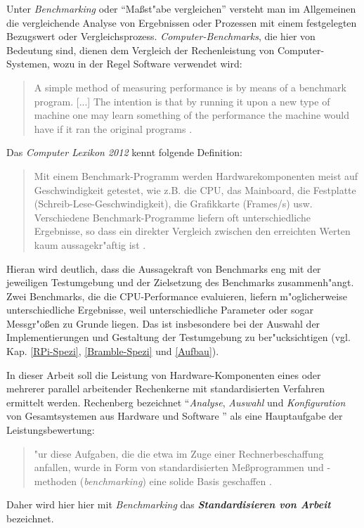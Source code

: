 Unter \textit{Benchmarking} oder "`Ma\ss st"abe vergleichen"' versteht man im Allgemeinen die vergleichende Analyse von Ergebnissen oder Prozessen mit einem festgelegten Bezugswert oder Vergleichsprozess. \textit{Computer-Benchmarks}, die hier von Bedeutung sind, dienen dem Vergleich der Rechenleistung von Computer-Systemen, wozu in der Regel Software verwendet wird:
\begin{quote}
\onehalfspacing
A simple method of measuring performance is by means of a benchmark program. [...] The intention is that by running it upon a new type of machine one may learn something of the performance the machine would have if it ran the original programs \cite{cur76}.
\end{quote}
Das \textit{Computer Lexikon 2012} kennt folgende Definition: 
\begin{quote}
\onehalfspacing
Mit einem Benchmark-Programm werden Hardwarekomponenten meist auf Geschwindigkeit getestet, wie z.B. die CPU, das Mainboard, die Festplatte (Schreib-Lese-Geschwindigkeit), die Grafikkarte (Frames/s) usw. Verschiedene Benchmark-Programme liefern oft unterschiedliche Ergebnisse, so dass ein direkter Vergleich zwischen den erreichten Werten kaum aussagekr"aftig ist \cite{pre11}. 
\end{quote}
Hieran wird deutlich, dass die Aussagekraft von Benchmarks eng mit der jeweiligen Testumgebung und der Zielsetzung des Benchmarks zusammenh"angt. Zwei Benchmarks, die die CPU-Performance evaluieren, liefern m"oglicherweise unterschiedliche Ergebnisse, weil unterschiedliche Parameter oder sogar Messgr"o\ss en zu Grunde liegen. Das ist insbesondere bei der Auswahl der Implementierungen und Gestaltung der Testumgebung zu ber"ucksichtigen (vgl. Kap. \ref{RPi-Spezi}, \ref{Bramble-Spezi} und \ref{Aufbau}). 

In dieser Arbeit soll die Leistung von Hardware-Komponenten eines oder mehrerer parallel arbeitender Rechenkerne mit standardisierten Verfahren ermittelt werden. Rechenberg bezeichnet "`\textit{Analyse}, \textit{Auswahl} und \textit{Konfiguration} von Gesamtsystemen aus Hardware und Software \cite{rec06}"' als eine Hauptaufgabe der Leistungsbewertung: 
\begin{quote}
\onehalfspacing
[F]"ur diese Aufgaben, die die etwa im Zuge einer Rechnerbeschaffung anfallen, wurde in Form von standardisierten Me\ss programmen und -methoden (\textit{benchmarking}) eine solide Basis geschaffen \cite{rec06}. 
\end{quote} 
Daher wird hier hier mit \textit{Benchmarking} das \textbf{\textit{Standardisieren von Arbeit}} bezeichnet.


